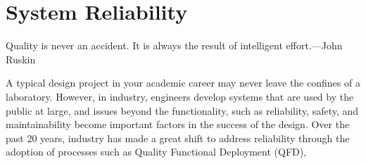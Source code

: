 \chapter{System Reliability}
\label{chapter:systemReliability}
\graphicspath{ {./chapter08/Fig} }

\begin{itquote}
Quality is never an accident. It is always the result of intelligent
effort.---John Ruskin
\end{itquote}


A typical design project in your academic career may never leave the
confines of a laboratory. However, in industry, engineers develop
systems that are used by the public at large, and issues beyond the
functionality, such as reliability, safety, and maintainability become
important factors in the success of the design. Over the past 20 years,
industry has made a great shift to address reliability through the
adoption of processes such as Quality Functional Deployment (QFD),
